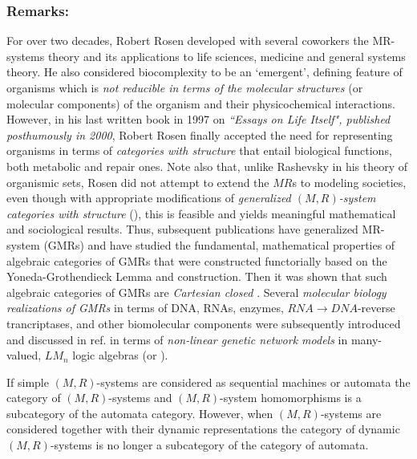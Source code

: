 \documentclass[12pt]{article}
\theoremstyle{plain}
\theoremstyle{definition}
\numberwithin{equation}{section}
\begin{document}
\subsubsection{Remarks:}
For over two decades, Robert Rosen developed with several coworkers the MR-systems theory and its applications
to life sciences, medicine and general systems theory.  He also considered biocomplexity to be an `emergent', defining feature of organisms which is \emph{not reducible in terms of the molecular structures} (or molecular components) of the organism and their physicochemical interactions. However, in his last written book in 1997 on \emph{``Essays on Life Itself", published posthumously in 2000}, Robert Rosen finally accepted the need for representing organisms in terms of {\em categories with structure} that entail biological functions, both metabolic and repair ones. Note also that, unlike Rashevsky in his theory of organismic sets, Rosen did not attempt to extend the $MR$s to modeling societies, even though with appropriate modifications of \emph{generalized $(M,R)$-system categories with structure} (\cite{ICB73, ICBM74, ICB87a}), this is feasible and yields meaningful mathematical and sociological results. 
Thus, subsequent publications have generalized MR-system (GMRs) and have studied the fundamental, mathematical properties of algebraic categories of GMRs that were constructed functorially based on the {Yoneda-Grothendieck Lemma}
and construction. Then it was shown that such algebraic categories of GMRs are \emph{Cartesian closed} \cite{ICB73}. 
Several \emph{molecular biology realizations of GMRs} in terms of DNA, RNAs, enzymes, 
$RNA \to DNA$-reverse trancriptases, and other biomolecular components were subsequently introduced and discussed in ref. \cite{BBGGk6,ICB87a, ICB87b} in terms of \emph{non-linear genetic network models} in many-valued, $LM_n$ logic algebras (or ).

If simple $(M,R)$-systems are considered as sequential machines or automata the category of $(M,R)$-systems and  $(M,R)$-system homomorphisms is a subcategory of the automata category. However, when $(M,R)$-systems are considered together with their dynamic representations the category of dynamic $(M,R)$-systems is no longer a subcategory of the category of automata.
\end{document}
